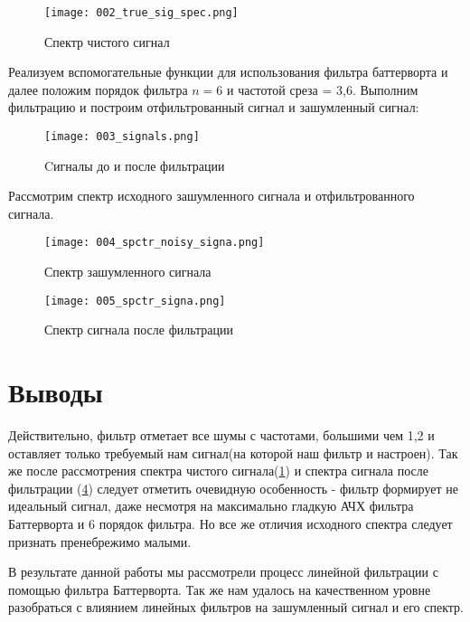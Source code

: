 \begin{figure}[H]
	\begin{center}
		\texttt{[image: 002\_true\_sig\_spec.png]}
		\caption{Спектр чистого сигнал} 
		\label{pic:pic02} %
	\end{center}
\end{figure} 

Реализуем вспомогательные функции для использования фильтра баттерворта и далее положим порядок фильтра $n = 6$ и частотой среза = 3,6. Выполним фильтрацию и построим отфильтрованный сигнал и зашумленный сигнал:

\begin{figure}[H]
	\begin{center}
		\texttt{[image: 003\_signals.png]}
		\caption{Cигналы до и после фильтрации} 
		\label{pic:pic03} %
	\end{center}
\end{figure} 

Рассмотрим спектр исходного зашумленного сигнала и отфильтрованного сигнала.

\begin{figure}[H]
	\begin{center}
		\texttt{[image: 004\_spctr\_noisy\_signa.png]}
		\caption{Спектр зашумленного сигнала } 
		\label{pic:pic04} %
	\end{center}
\end{figure} 

\begin{figure}[H]
	\begin{center}
		\texttt{[image: 005\_spctr\_signa.png]}
		\caption{Спектр сигнала после фильтрации} 
		\label{pic:pic05} %
	\end{center}
\end{figure} 


\section{Выводы}
Действительно, фильтр отметает все шумы с частотами, большими чем 1,2 и оставляет только требуемый нам сигнал(на которой наш фильтр и настроен). Так же после рассмотрения спектра чистого сигнала(\ref{pic:pic02}) и спектра сигнала после фильтрации (\ref{pic:pic05}) следует отметить
очевидную особенность - фильтр формирует не идеальный сигнал, даже несмотря на максимально гладкую АЧХ фильтра Баттерворта и 6 порядок фильтра. Но все же отличия исходного спектра следует признать пренебрежимо малыми.
  
В результате данной работы мы рассмотрели процесс линейной фильтрации с помощью фильтра Баттерворта. 
Так же нам удалось на качественном уровне разобраться с влиянием линейных фильтров на зашумленный сигнал и его спектр.



